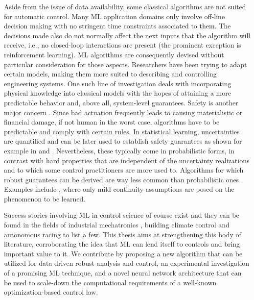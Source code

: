 Aside from the issue of data availability, some classical algorithms are not suited for automatic control. Many ML application domains only involve off-line decision making with no stringent time constraints associated to them. The decisions made also do not normally affect the next inputs that the algorithm will receive, i.e., no closed-loop interactions are present (the prominent exception is reinforcement learning). ML algorithms are consequently devised without particular consideration for those aspects. Researchers have been trying to adapt certain models, making them more suited to describing and controlling engineering systems. One such line of investigation deals with incorporating physical knowledge into classical models \citep{galimberti2021hamiltonian,di2022physically} with the hopes of attaining a more predictable behavior and, above all, system-level guarantees. Safety is another major concern \citep{hewing2020learning,brunke2022safe}. Since bad actuation frequently leads to causing materialistic or financial damage, if not human in the worst case, algorithms have to be predictable and comply with certain rules. In statistical learning, uncertainties are quantified and can be later used to establish safety guarantees as shown for example in \cite{hewing2019cautious} and \cite{lederer2022cooperative}. Nevertheless, these typically come in probabilistic forms, in contrast with hard properties that are independent of the uncertainty realizations and to which some control practitioners are more used to. Algorithms for which robust guarantees can be derived are way less common than probabilistic ones. Examples include \cite{milanese2004set,sabug2021smgo}, where only mild continuity assumptions are posed on the phenomenon to be learned.

Success stories involving ML in control science of course exist and they can be found in the fields of industrial mechatronics \citep{khosravi2022safety}, building climate control \citep{lian2021adaptive} and autonomous racing \citep{hewing2019cautious} to list a few. This thesis aims at strengthening this body of literature, corroborating the idea that ML can lend itself to controls and bring important value to it. We contribute by proposing a new algorithm that can be utilized for data-driven robust analysis and control, an experimental investigation of a promising ML technique, and a novel neural network architecture that can be used to scale-down the computational requirements of a well-known optimization-based control law.



